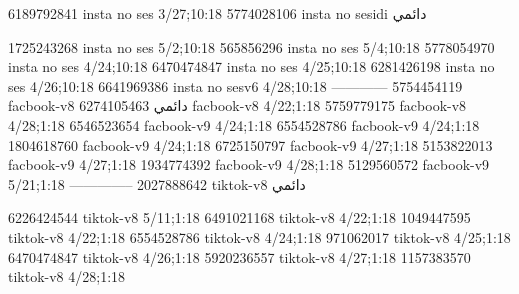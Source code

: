 
6189792841 insta no ses
3/27;10:18
5774028106 insta no sesidi
دائمي


1725243268 insta no ses
5/2;10:18
565856296 insta no ses
5/4;10:18
5778054970 insta no ses
4/24;10:18
6470474847 insta no ses
4/25;10:18
6281426198 insta no ses
4/26;10:18
6641969386 insta no sesv6
4/28;10:18
------------
5754454119 facbook-v8
دائمي
6274105463 facbook-v8
4/22;1:18
5759779175 facbook-v8
4/28;1:18
6546523654 facbook-v9
4/24;1:18
6554528786 facbook-v9
4/24;1:18
1804618760 facbook-v9
4/24;1:18
6725150797 facbook-v9
4/27;1:18
5153822013 facbook-v9
4/27;1:18
1934774392 facbook-v9
4/28;1:18
5129560572 facbook-v9
5/21;1:18
--------------
2027888642 tiktok-v8
دائمي

6226424544 tiktok-v8
5/11;1:18
6491021168 tiktok-v8
4/22;1:18
1049447595 tiktok-v8
4/22;1:18
6554528786 tiktok-v8
4/24;1:18
971062017 tiktok-v8
4/25;1:18
6470474847 tiktok-v8
4/26;1:18
5920236557 tiktok-v8
4/27;1:18
1157383570 tiktok-v8
4/28;1:18
